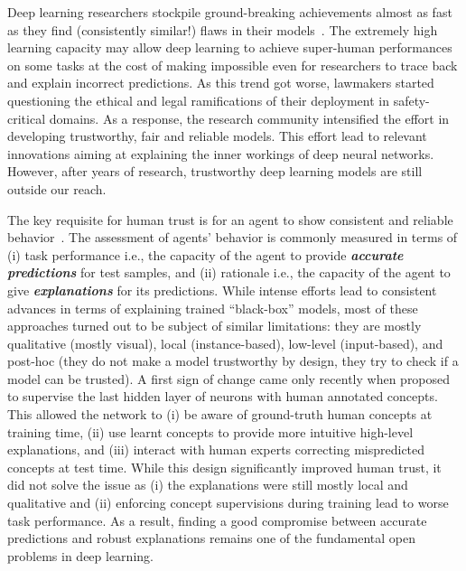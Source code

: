 \documentclass[withindex,glossary]{cam-thesis}
\theoremstyle{plain}
\theoremstyle{definition}
\theoremstyle{remark}
\begin{document}
Deep learning researchers stockpile ground-breaking achievements almost as fast as they find (consistently similar!) flaws in their models~\citep{marcus2022very}. The extremely high learning capacity may allow deep learning to achieve super-human performances on some tasks at the cost of making impossible even for researchers to trace back and explain incorrect predictions. As this trend got worse, lawmakers started questioning the ethical and legal ramifications of their deployment in safety-critical domains. As a response, the research community intensified the effort in developing trustworthy, fair and reliable models. This effort lead to relevant innovations aiming at explaining the inner workings of deep neural networks. However, after years of research, trustworthy deep learning models are still outside our reach.

The key requisite for human trust is for an agent to show consistent and reliable behavior~\citep{shen2022trust}. The assessment of agents' behavior is commonly measured in terms of (i) task performance i.e., the capacity of the agent to provide \textbf{\textit{accurate predictions}} for test samples, and (ii) rationale i.e., the capacity of the agent to give \textbf{\textit{explanations}} for its predictions. While intense efforts lead to consistent advances in terms of explaining trained ``black-box'' models, most of these approaches turned out to be subject of similar limitations: they are mostly qualitative (mostly visual), local (instance-based), low-level (input-based), and post-hoc (they do not make a model trustworthy by design, they try to check if a model can be trusted). A first sign of change came only recently when \citet{koh2020concept} proposed to supervise the last hidden layer of neurons with human annotated concepts. This allowed the network to (i) be aware of ground-truth human concepts at training time, (ii) use learnt concepts to provide more intuitive high-level explanations, and (iii) interact with human experts correcting mispredicted concepts at test time. While this design significantly improved human trust, it did not solve the issue as (i) the explanations were still mostly local and qualitative and (ii) enforcing concept supervisions during training lead to worse task performance. As a result, finding a good compromise between accurate predictions and robust explanations remains one of the fundamental open problems in deep learning.
\end{document}

